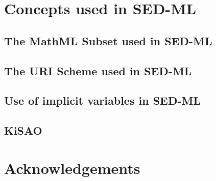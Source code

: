 \documentclass[11pt]{article}
\begin{document}

\tableofcontents
\newpage


  

  
  \section{Concepts used in SED-ML}

  \subsection{The MathML Subset used in SED-ML}
  

  \subsection{The URI Scheme used in SED-ML}  
  
  
  \subsection{Use of implicit variables in SED-ML}
  
  \label{sec:implicitVariable}

  \subsection{KiSAO}
  

  

  


  

\section*{Acknowledgements}

\end{document}

